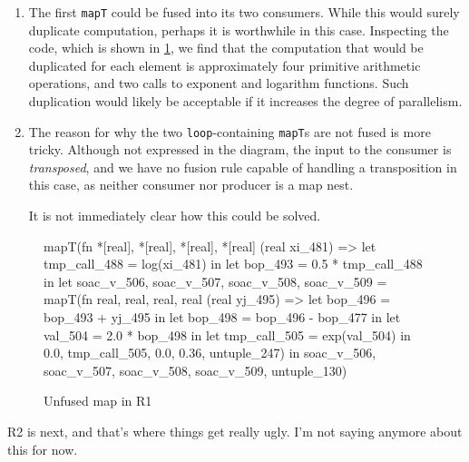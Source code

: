 \begin{enumerate}
\item The first \texttt{mapT} could be fused into its two consumers.
  While this would surely duplicate computation, perhaps it is
  worthwhile in this case.  Inspecting the code, which is shown in
  \cref{fig:r1-unfused-map}, we find that the computation that would
  be duplicated for each element is approximately four primitive
  arithmetic operations, and two calls to exponent and logarithm
  functions.  Such duplication would likely be acceptable if it
  increases the degree of parallelism.

\item The reason for why the two \texttt{loop}-containing
  \texttt{mapT}s are not fused is more tricky.  Although not expressed
  in the diagram, the input to the consumer is \textit{transposed},
  and we have no fusion rule capable of handling a transposition in
  this case, as neither consumer nor producer is a map nest.

  It is not immediately clear how this could be solved.
\end{enumerate}

\begin{figure}
\begin{bcolorcode}
mapT(fn {*[real], *[real], *[real], *[real]} (real xi_481) =>
       let tmp_call_488 = log(xi_481) in
       let bop_493 = 0.5 * tmp_call_488 in
       let {soac_v_506, soac_v_507, soac_v_508, soac_v_509} =
         mapT(fn {real, real, real, real} (real yj_495) =>
                let bop_496 = bop_493 + yj_495 in
                let bop_498 = bop_496 - bop_477 in
                let val_504 = 2.0 * bop_498 in
                let tmp_call_505 = exp(val_504) in
                {0.0, tmp_call_505, 0.0, 0.36},
              untuple_247) in
       {soac_v_506, soac_v_507, soac_v_508, soac_v_509},
     untuple_130)
\end{bcolorcode}
\caption{Unfused map in R1}
\label{fig:r1-unfused-map}
\end{figure}

R2 is next, and that's where things get really ugly.  I'm not saying
anymore about this for now. 

